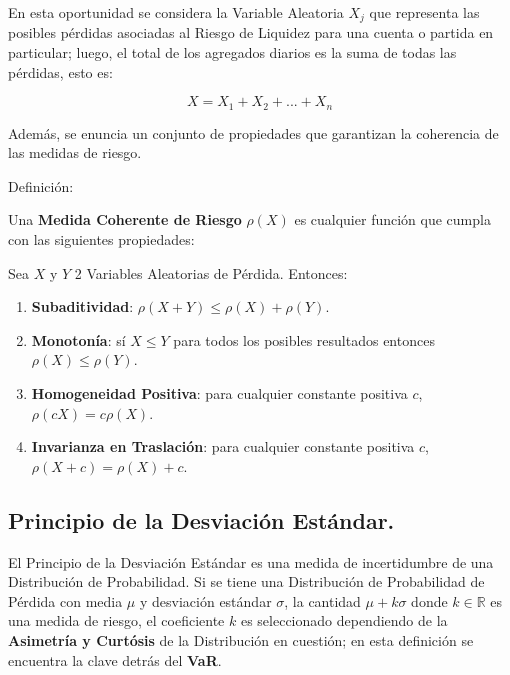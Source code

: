 \documentclass[]{article}
\providecommand{\tightlist}{%
  \setlength{\itemsep}{0pt}\setlength{\parskip}{0pt}}
\begin{document}
En esta oportunidad se considera la Variable Aleatoria \(X_j\) que
representa las posibles pérdidas asociadas al Riesgo de Liquidez para
una cuenta o partida en particular; luego, el total de los agregados
diarios es la suma de todas las pérdidas, esto es:

\[X=X_1+X_2+...+X_n\]

Además, se enuncia un conjunto de propiedades que garantizan la
coherencia de las medidas de riesgo.

Definición:

Una \textbf{Medida Coherente de Riesgo} \(\rho(X)\) es cualquier función
que cumpla con las siguientes propiedades:

Sea \(X\) y \(Y\) 2 Variables Aleatorias de Pérdida. Entonces:

\begin{enumerate}
\def\labelenumi{\arabic{enumi})}
\tightlist
\item
  \textbf{Subaditividad}: \(\rho(X+Y) \leq \rho(X)+\rho(Y)\).\\
\item
  \textbf{Monotonía}: sí \(X \leq Y\) para todos los posibles resultados
  entonces \(\rho(X)\leq\rho(Y)\).\\
\item
  \textbf{Homogeneidad Positiva}: para cualquier constante positiva
  \(c\), \(\rho(cX)=c\rho(X)\).\\
\item
  \textbf{Invarianza en Traslación}: para cualquier constante positiva
  \(c\), \(\rho(X+c)=\rho(X)+c\).
\end{enumerate}

\hypertarget{principio-de-la-desviacion-estandar.}{%
\subsection{\texorpdfstring{\textbf{Principio de la Desviación
Estándar.}}{Principio de la Desviación Estándar.}}\label{principio-de-la-desviacion-estandar.}}

El Principio de la Desviación Estándar es una medida de incertidumbre de
una Distribución de Probabilidad. Si se tiene una Distribución de
Probabilidad de Pérdida con media \(\mu\) y desviación estándar
\(\sigma\), la cantidad \(\mu+k\sigma\) donde \(k\in \mathbb{R}\) es una
medida de riesgo, el coeficiente \(k\) es seleccionado dependiendo de la
\textbf{Asimetría y Curtósis} de la Distribución en cuestión; en esta
definición se encuentra la clave detrás del \textbf{VaR}.
\end{document}
